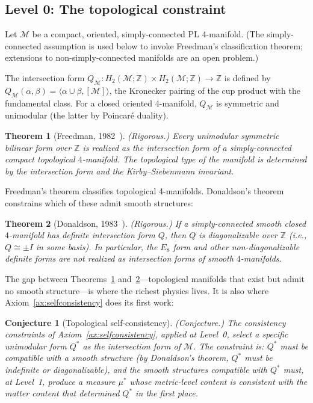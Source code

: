 \documentclass[12pt,a4paper]{article}
\newtheorem{theorem}{Theorem}
\newtheorem{conjecture}{Conjecture}
\theoremstyle{definition}
\theoremstyle{remark}
\begin{document}
\subsection{Level 0: The topological constraint}
\label{sec:level0}

Let $\mathcal{M}$ be a compact, oriented, simply-connected PL 4-manifold.
(The simply-connected assumption is used below to invoke Freedman's
classification theorem; extensions to non-simply-connected manifolds are an
open problem.)

The intersection form $Q_\mathcal{M}: H_2(\mathcal{M};\mathbb{Z}) \times
H_2(\mathcal{M};\mathbb{Z}) \to \mathbb{Z}$ is defined by
$Q_\mathcal{M}(\alpha,\beta) = \langle \alpha \cup \beta, [\mathcal{M}]\rangle$,
the Kronecker pairing of the cup product with the fundamental class. For a
closed oriented 4-manifold, $Q_\mathcal{M}$ is symmetric and unimodular (the
latter by Poincar\'e duality).

\begin{theorem}[Freedman, 1982~\cite{freedman}]
\emph{(Rigorous.)}
\label{thm:freedman}
Every unimodular symmetric bilinear form over $\mathbb{Z}$ is realized as
the intersection form of a simply-connected compact topological
$4$-manifold. The topological type of the manifold is determined by the
intersection form and the Kirby--Siebenmann invariant.
\end{theorem}

Freedman's theorem classifies topological 4-manifolds. Donaldson's theorem
constrains which of these admit smooth structures:

\begin{theorem}[Donaldson, 1983~\cite{donaldson}]
\emph{(Rigorous.)}
\label{thm:donaldson}
If a simply-connected smooth closed $4$-manifold has definite intersection
form $Q$, then $Q$ is diagonalizable over $\mathbb{Z}$ (i.e., $Q \cong
\pm I$ in some basis). In particular, the $E_8$ form and other non-diagonalizable
definite forms are not realized as intersection forms of smooth $4$-manifolds.
\end{theorem}

The gap between Theorems~\ref{thm:freedman} and~\ref{thm:donaldson}---topological
manifolds that exist but admit no smooth structure---is where the richest physics
lives. It is also where Axiom~\ref{ax:selfconsistency} does its first work:

\begin{conjecture}[Topological self-consistency]
\label{conj:level0}
\emph{(Conjecture.)}
The consistency constraints of Axiom~\ref{ax:selfconsistency}, applied at
Level~0, select a specific unimodular form $Q^*$ as the intersection form of
$\mathcal{M}$. The constraint is: $Q^*$ must be compatible with a smooth
structure (by Donaldson's theorem, $Q^*$ must be indefinite or diagonalizable),
and the smooth structures compatible with $Q^*$ must, at Level~1, produce a
measure $\mu^*$ whose metric-level content is consistent with the matter
content that determined $Q^*$ in the first place.
\end{conjecture}
\end{document}
